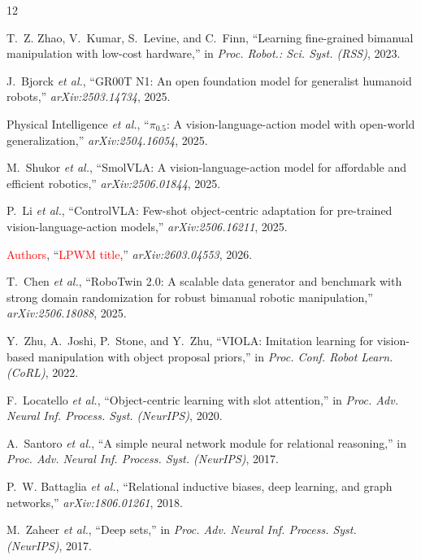 \documentclass[letterpaper, 10pt, journal, twoside]{IEEEtran}
\begin{document}
\begin{thebibliography}{12}

T.~Z. Zhao, V.~Kumar, S.~Levine, and C.~Finn, ``Learning fine-grained
bimanual manipulation with low-cost hardware,'' in \emph{Proc. Robot.: Sci.
Syst. (RSS)}, 2023.

J.~Bjorck \emph{et al.}, ``GR00T N1: An open foundation model for generalist
humanoid robots,'' \emph{arXiv:2503.14734}, 2025. %

Physical Intelligence \emph{et al.}, ``$\pi_{0.5}$: A vision-language-action
model with open-world generalization,'' \emph{arXiv:2504.16054}, 2025. %

M.~Shukor \emph{et al.}, ``SmolVLA: A vision-language-action model for
affordable and efficient robotics,'' \emph{arXiv:2506.01844}, 2025. %

P.~Li \emph{et al.}, ``ControlVLA: Few-shot object-centric adaptation for
pre-trained vision-language-action models,'' \emph{arXiv:2506.16211}, 2025. %

\textcolor{red}{Authors}, ``\textcolor{red}{LPWM title},''
\emph{arXiv:2603.04553}, 2026. %

T.~Chen \emph{et al.}, ``RoboTwin 2.0: A scalable data generator and
benchmark with strong domain randomization for robust bimanual robotic
manipulation,'' \emph{arXiv:2506.18088}, 2025. %

Y.~Zhu, A.~Joshi, P.~Stone, and Y.~Zhu, ``VIOLA: Imitation learning for
vision-based manipulation with object proposal priors,'' in \emph{Proc.
Conf. Robot Learn. (CoRL)}, 2022.

F.~Locatello \emph{et al.}, ``Object-centric learning with slot attention,''
in \emph{Proc. Adv. Neural Inf. Process. Syst. (NeurIPS)}, 2020.

A.~Santoro \emph{et al.}, ``A simple neural network module for relational
reasoning,'' in \emph{Proc. Adv. Neural Inf. Process. Syst. (NeurIPS)}, 2017.

P.~W. Battaglia \emph{et al.}, ``Relational inductive biases, deep learning,
and graph networks,'' \emph{arXiv:1806.01261}, 2018.

M.~Zaheer \emph{et al.}, ``Deep sets,'' in \emph{Proc. Adv. Neural Inf.
Process. Syst. (NeurIPS)}, 2017.

\end{thebibliography}
\end{document}
